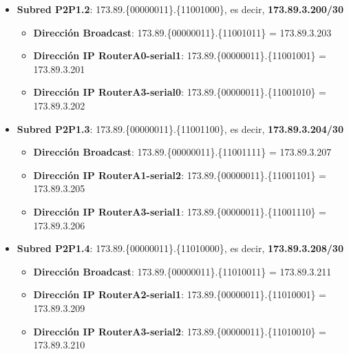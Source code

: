 \begin{itemize}
\begin{itemize}
		\end{itemize}
	\item{\textbf{Subred P2P1.2}:} 173.89.\{\textcolor{azul}{000000}\textcolor{rojo}{11}\}.\{\textcolor{rojo}{110010}00\}, es decir, \textbf{173.89.3.200/30}
		\begin{itemize}
			\item{\textbf{Dirección Broadcast}}: 173.89.\{\textcolor{azul}{000000}\textcolor{rojo}{11}\}.\{\textcolor{rojo}{110010}11\} = 173.89.3.203
			\item{\textbf{Dirección IP RouterA0-serial1}}: 173.89.\{\textcolor{azul}{000000}\textcolor{rojo}{11}\}.\{\textcolor{rojo}{110010}01\} = 173.89.3.201
			\item{\textbf{Dirección IP RouterA3-serial0}}: 173.89.\{\textcolor{azul}{000000}\textcolor{rojo}{11}\}.\{\textcolor{rojo}{110010}10\} = 173.89.3.202
		\end{itemize}
	\item{\textbf{Subred P2P1.3}:} 173.89.\{\textcolor{azul}{000000}\textcolor{rojo}{11}\}.\{\textcolor{rojo}{110011}00\}, es decir, \textbf{173.89.3.204/30}
		\begin{itemize}
			\item{\textbf{Dirección Broadcast}}: 173.89.\{\textcolor{azul}{000000}\textcolor{rojo}{11}\}.\{\textcolor{rojo}{110011}11\} = 173.89.3.207
			\item{\textbf{Dirección IP RouterA1-serial2}}: 173.89.\{\textcolor{azul}{000000}\textcolor{rojo}{11}\}.\{\textcolor{rojo}{110011}01\} = 173.89.3.205
			\item{\textbf{Dirección IP RouterA3-serial1}}: 173.89.\{\textcolor{azul}{000000}\textcolor{rojo}{11}\}.\{\textcolor{rojo}{110011}10\} = 173.89.3.206
		\end{itemize}
	\item{\textbf{Subred P2P1.4}:} 173.89.\{\textcolor{azul}{000000}\textcolor{rojo}{11}\}.\{\textcolor{rojo}{110100}00\}, es decir, \textbf{173.89.3.208/30}
		\begin{itemize}
			\item{\textbf{Dirección Broadcast}}: 173.89.\{\textcolor{azul}{000000}\textcolor{rojo}{11}\}.\{\textcolor{rojo}{110100}11\} = 173.89.3.211
			\item{\textbf{Dirección IP RouterA2-serial1}}: 173.89.\{\textcolor{azul}{000000}\textcolor{rojo}{11}\}.\{\textcolor{rojo}{110100}01\} = 173.89.3.209
			\item{\textbf{Dirección IP RouterA3-serial2}}: 173.89.\{\textcolor{azul}{000000}\textcolor{rojo}{11}\}.\{\textcolor{rojo}{110100}10\} = 173.89.3.210

\end{itemize}
\end{itemize}
